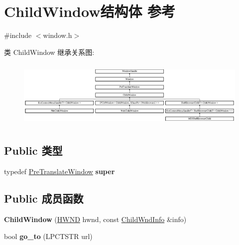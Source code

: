\hypertarget{struct_child_window}{}\section{Child\+Window结构体 参考}
\label{struct_child_window}


{\ttfamily \#include $<$window.\+h$>$}

类 Child\+Window 继承关系图\+:\begin{figure}[H]
\begin{center}
\leavevmode
\includegraphics[height=3.308017cm]{struct_child_window}
\end{center}
\end{figure}
\subsection*{Public 类型}
\begin{DoxyCompactItemize}
\item 
\mbox{\label{struct_child_window_a9fb24a5a6cf6ff6a9eabce8ba315130d}} 
typedef \hyperlink{struct_pre_translate_window}{Pre\+Translate\+Window} {\bfseries super}
\end{DoxyCompactItemize}
\subsection*{Public 成员函数}
\begin{DoxyCompactItemize}
\item 
\mbox{\label{struct_child_window_af1305ef61950e14330c922e7287f5e4f}} 
{\bfseries Child\+Window} (\hyperlink{interfacevoid}{H\+W\+ND} hwnd, const \hyperlink{struct_child_wnd_info}{Child\+Wnd\+Info} \&info)
\item 
\mbox{\label{struct_child_window_a3c61c02f045044fbcb0a0416586b2a57}} 
bool {\bfseries go\+\_\+to} (L\+P\+C\+T\+S\+TR url)
\end{DoxyCompactItemize}
